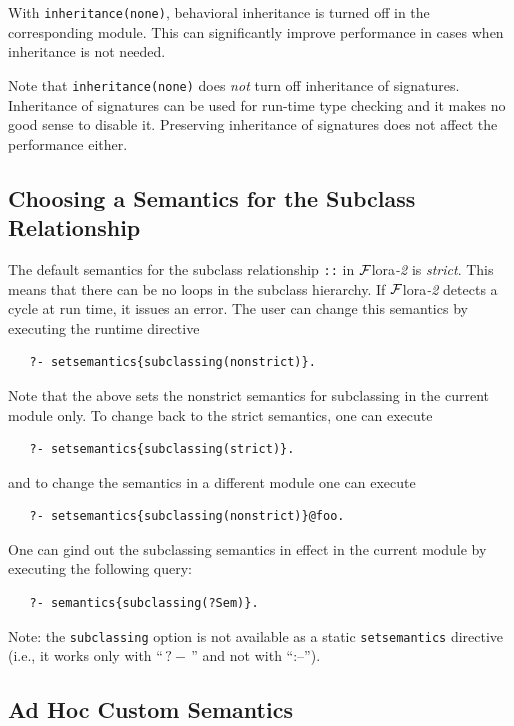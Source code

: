 \documentclass[11pt]{article}
\newcommand{\FLSYSTEM}{{\mbox{\sc ${\cal F}${lora}\rm\emph{-2}}}\xspace}
\newcommand{\query}{\mbox{$\, ?\! - \, $}}                  %
\begin{document}
With {\tt inheritance(none)}, behavioral inheritance is turned off in the
corresponding module.  This can significantly improve performance in cases
when inheritance is not needed.

Note that {\tt inheritance(none)} does \emph{not} turn off inheritance of
signatures. Inheritance of signatures can be used for run-time type checking
and it makes no good sense to disable it. Preserving inheritance of
signatures does not affect the performance either.

\subsection{Choosing a Semantics for the Subclass Relationship}

The default semantics for the subclass relationship \texttt{::} in
\FLSYSTEM is \emph{strict}. This means that there can be no loops in the
subclass hierarchy. If \FLSYSTEM detects a cycle at run time, it issues an
error.  The user can change this semantics by executing the runtime directive
\begin{verbatim}
   ?- setsemantics{subclassing(nonstrict)}.
\end{verbatim}
Note that the above sets the nonstrict semantics for subclassing in the
current module only. To change back to the strict semantics, one can execute
\begin{verbatim}
   ?- setsemantics{subclassing(strict)}.
\end{verbatim}
and to change the semantics in a different module one can execute
\begin{verbatim}
   ?- setsemantics{subclassing(nonstrict)}@foo.
\end{verbatim}

One can gind out the subclassing semantics in effect in the current module
by executing the following query:
\begin{verbatim}
   ?- semantics{subclassing(?Sem)}.
\end{verbatim}
Note: the \texttt{subclassing} option is not available as a static
\texttt{setsemantics} directive (i.e., it works only with ``$\query$''
and not with ``:--'').

\subsection{Ad Hoc Custom Semantics}\label{sec-ad-hoc-semantics}
\end{document}
